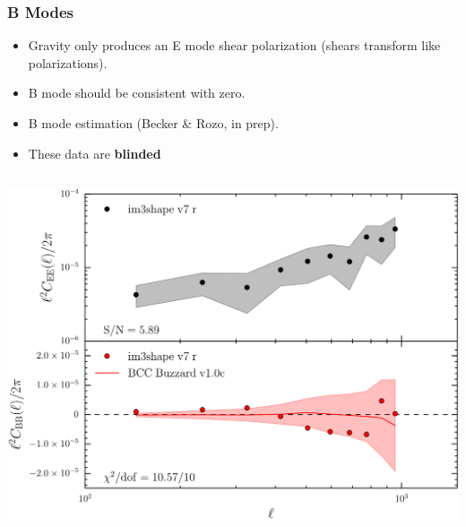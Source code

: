 \documentclass{beamer}
\begin{document}
\frame
{
    \frametitle{B Modes}

    \fontsize{9}{0.8\baselineskip}
    \begin{itemize}

        \item Gravity only produces an E mode shear polarization (shears transform like
            polarizations).

        \item B mode should be consistent with zero.

        \item B mode estimation (Becker \& Rozo, in prep).


        \item These data are {\bf blinded}

    \end{itemize}

    \begin{columns}


        \begin{column}{0.5\textwidth}
            \begin{center}
                \includegraphics[width=1.05\textwidth]{im3shape_v7_r_crop.pdf}
            \end{center}
        \end{column}


\end{columns}}
\end{document}
